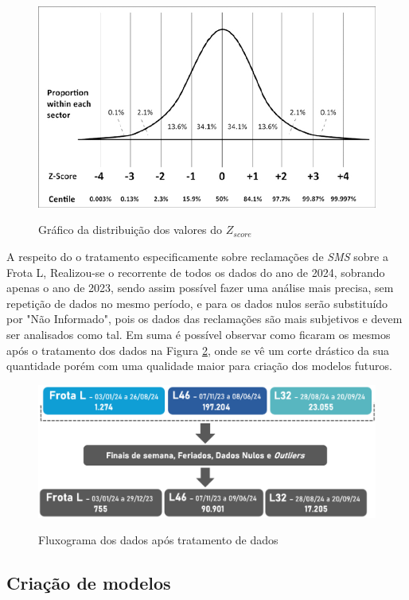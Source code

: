 \documentclass[acronym,symbols,table]{fei}
\begin{document}
\begin{figure}[!htb]
    \centering
    \caption{Gráfico da distribuição dos valores do \textit{${Z}_{score}$}}
    \includegraphics[width=0.7\linewidth]{Imagens/Z_score.jpg}
    \label{fig:zscore}
\end{figure}


A respeito do o tratamento especificamente sobre reclamações de \textit{SMS} sobre a Frota L, Realizou-se o recorrente de todos os dados do ano de 2024, sobrando apenas o ano de 2023, sendo assim possível fazer uma análise mais precisa, sem repetição de dados no mesmo período, e para os dados nulos serão substituído por "Não Informado", pois os dados das reclamações são mais subjetivos e devem ser analisados como tal. Em suma é possível observar como ficaram os mesmos após o tratamento dos dados na Figura \ref{fig:Fluxograma_tratamento_dados}, onde se vê um corte drástico da sua quantidade porém com uma qualidade maior para criação dos modelos futuros.
  
\begin{figure}[!htb]
    \centering
    \caption{Fluxograma dos dados após tratamento de dados}
    \includegraphics[width=0.8\linewidth]{Imagens/Fluxograma_tratamento_dados.png}
    \label{fig:Fluxograma_tratamento_dados}
\end{figure}

  
\subsection{Criação de modelos}
\end{document}
